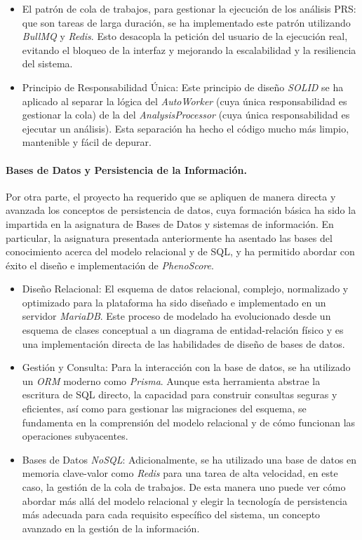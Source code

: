 \begin{itemize}
    \item El patrón de cola de trabajos, para gestionar la ejecución de los análisis PRS: que son tareas de larga duración, se ha implementado este patrón utilizando \textit{BullMQ} y \textit{Redis}. Esto desacopla la petición del usuario de la ejecución real, evitando el bloqueo de la interfaz y mejorando la escalabilidad y la resiliencia del sistema.
    \item Principio de Responsabilidad Única: Este principio de diseño \textit{SOLID} \cite{martin} se ha aplicado al separar la lógica del \textit{AutoWorker} (cuya única responsabilidad es gestionar la cola) de la del \textit{AnalysisProcessor} (cuya única responsabilidad es ejecutar un análisis). Esta separación ha hecho el código mucho más limpio, mantenible y fácil de depurar.
\end{itemize}

\paragraph{Bases de Datos y Persistencia de la Información.}
Por otra parte, el proyecto ha requerido que se apliquen de manera directa y avanzada los conceptos de persistencia de datos, cuya formación básica ha sido la impartida en la asignatura de Bases de Datos y sistemas de información. En particular, la asignatura presentada anteriormente ha asentado las bases del conocimiento acerca del modelo relacional y de SQL, y ha permitido abordar con éxito el diseño e implementación de \textit{PhenoScore}.

\begin{itemize}
\item Diseño Relacional: El esquema de datos relacional, complejo, normalizado y optimizado para la plataforma ha sido diseñado e implementado en un servidor \textit{MariaDB}. Este proceso de modelado ha evolucionado desde un esquema de clases conceptual a un diagrama de entidad-relación físico y es una implementación directa de las habilidades de diseño de bases de datos.

\item Gestión y Consulta: Para la interacción con la base de datos, se ha utilizado un \textit{ORM} moderno como \textit{Prisma}. Aunque esta herramienta abstrae la escritura de SQL directo, la capacidad para construir consultas seguras y eficientes, así como para gestionar las migraciones del esquema, se fundamenta en la comprensión del modelo relacional y de cómo funcionan las operaciones subyacentes.

\item Bases de Datos \textit{NoSQL}: Adicionalmente, se ha utilizado una base de datos en memoria clave-valor como \textit{Redis} para una tarea de alta velocidad, en este caso, la gestión de la cola de trabajos. De esta manera uno puede ver cómo abordar más allá del modelo relacional y elegir la tecnología de persistencia más adecuada para cada requisito específico del sistema, un concepto avanzado en la gestión de la información.
\end{itemize}

